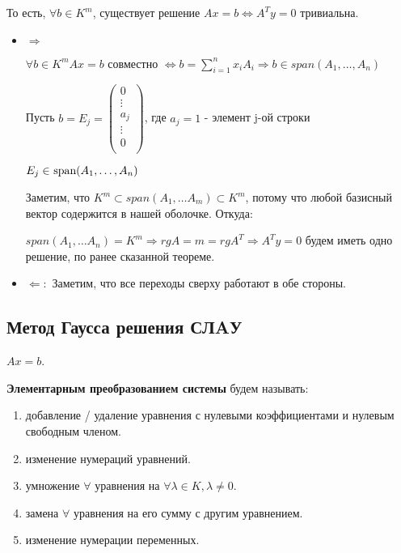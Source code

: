 То есть, \(\forall b \in K^m\), существует решение \(Ax = b \Leftrightarrow A^Ty = 0\) тривиальна.

\begin{itemize}
    \item \(\Rightarrow\)

          \(\forall b \in K^m Ax = b\) совместно \(\Leftrightarrow b = \sum\limits_{i=1}^n x_iA_i  \Rightarrow b \in span(A_1,\ldots,A_n)\)

          Пусть \(b = E_j = \begin{pmatrix}
              0 \\ \vdots\\a_j\\ \vdots\\ 0 \\
          \end{pmatrix}\), где \(a_j = 1\) - элемент j-ой строки

          \(E_j \in \spann(A_1,\ldots, A_n)\)

          Заметим, что \(K^m \subset span(A_1,\ldots A_m) \subset K^m\), потому что любой базисный вектор  содержится в нашей оболочке. Откуда:

          \(span(A_1,\ldots A_n)  = K^m \Rightarrow rg A = m = rg A^T \Rightarrow A^Ty=0\) будем иметь одно решение, по ранее сказанной теореме.

    \item \(\Leftarrow:\)
          Заметим, что все переходы сверху работают в обе стороны.

\end{itemize}








\subsection{Метод Гаусса решения СЛAУ}

\(Ax=b\).

\textbf{Элементарным преобразованием системы} будем называть:

\begin{enumerate}
    \item добавление / удаление уравнения с нулевыми коэффициентами и нулевым свободным членом.
    \item изменение нумераций уравнений.
    \item умножение \(\forall\) уравнения на \(\forall \lambda \in K, \lambda \neq 0\).
    \item замена \(\forall\) уравнения на его сумму с другим уравнением.
    \item изменение нумерации переменных.
\end{enumerate}

